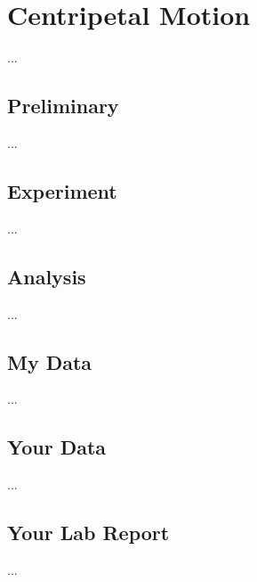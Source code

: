 \chapter{Centripetal Motion}
...
\section{Preliminary}
...
\section{Experiment}
...
\section{Analysis}
...
\section{My Data}
...
\section{Your Data}
...
\section{Your Lab Report}
...